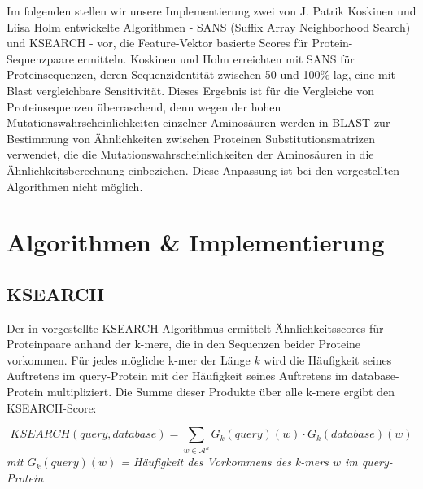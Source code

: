 \documentclass{article}
\begin{document}
Im folgenden stellen wir unsere Implementierung zwei von J. Patrik Koskinen und Liisa Holm entwickelte Algorithmen - SANS (Suffix Array Neighborhood Search) und KSEARCH - vor, die Feature-Vektor basierte Scores für Protein-Sequenzpaare ermitteln. Koskinen und Holm erreichten mit SANS für Proteinsequenzen, deren Sequenzidentität zwischen 50 und 100\% lag, eine mit Blast vergleichbare Sensitivität. Dieses Ergebnis ist für die Vergleiche von Proteinsequenzen überraschend, denn wegen der hohen Mutationswahrscheinlichkeiten einzelner Aminosäuren werden in BLAST zur Bestimmung von Ähnlichkeiten zwischen Proteinen Substitutionsmatrizen verwendet, die die Mutationswahrscheinlichkeiten der Aminosäuren in die Ähnlichkeitsberechnung einbeziehen. 
Diese Anpassung ist bei den vorgestellten Algorithmen nicht möglich.


\section{Algorithmen \& Implementierung}

\subsection{KSEARCH}
\label{ksearch}

Der in \cite{Holm} vorgestellte KSEARCH-Algorithmus ermittelt Ähnlichkeitsscores für Proteinpaare anhand der k-mere, die in den Sequenzen beider Proteine vorkommen. Für jedes mögliche k-mer der Länge $k$ wird die Häufigkeit seines Auftretens im query-Protein mit der Häufigkeit seines Auftretens im database-Protein multipliziert. Die Summe dieser Produkte über alle k-mere ergibt den KSEARCH-Score:

\begin{equation}
KSEARCH(query,database) = \sum_{w \in \mathcal A^k} G_k(query)(w) \cdot G_k(database)(w)
\end{equation}  
\textit{mit $G_k(query)(w)$ = Häufigkeit des Vorkommens des k-mers $w$ im query-Protein}\\ \\
\end{document}
